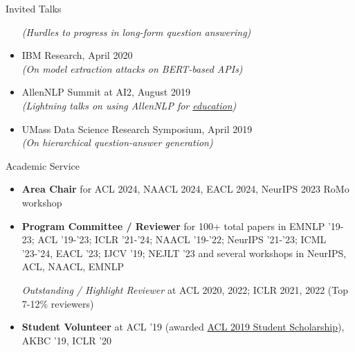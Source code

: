 \documentclass{resume} %
\begin{document}
\begin{rSection}{Invited Talks}
\begin{itemize}[leftmargin=*]
\textit{(Hurdles to progress in long-form question answering)}
\item IBM Research, April 2020\\
\textit{(On model extraction attacks on BERT-based APIs)}
\item AllenNLP Summit at AI2, August 2019 \\
\textit{(Lightning talks on using AllenNLP for \href{https://github.com/martiansideofthemoon/allennlp-probe-hw}{education})}
\item UMass Data Science Research Symposium, April 2019 \\
\textit{(On hierarchical question-answer generation)}
\end{itemize}
\end{rSection}

\pagebreak
\begin{rSection}{Academic Service}
\vspace*{0.1in}
\begin{itemize}[leftmargin=*]

\item \textbf{Area Chair} for ACL 2024, NAACL 2024, EACL 2024, NeurIPS 2023 RoMo workshop

\item \textbf{Program Committee / Reviewer} for 100+ total papers in EMNLP '19-23; ACL '19-'23; ICLR '21-'24; NAACL '19-'22; NeurIPS '21-'23; ICML '23-'24, EACL '23; IJCV '19; NEJLT '23 and several workshops in NeurIPS, ACL, NAACL, EMNLP

\emph{Outstanding / Highlight Reviewer} at ACL 2020, 2022; ICLR 2021, 2022  (Top 7-12\% reviewers)

\item \textbf{Student Volunteer} at ACL '19 (awarded \href{http://www.acl2019.org/EN/student-scholarship-applications-volunteers.xhtml}{ACL 2019 Student Scholarship}), AKBC '19, ICLR '20
\end{itemize}
\end{rSection}

\vspace*{0.1in}
\end{document}
